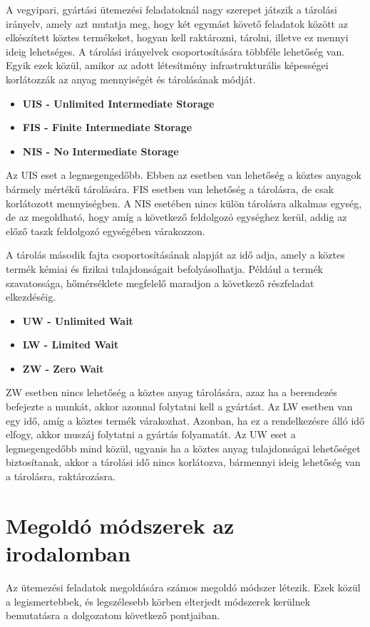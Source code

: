 \newpage
A vegyipari, gyártási ütemezési feladatoknál nagy szerepet játszik a tárolási irányelv, amely azt mutatja meg, hogy két egymást követő feladatok között az elkészített köztes termékeket, hogyan kell raktározni, tárolni, illetve ez mennyi ideig lehetséges. A tárolási irányelvek csoportosítására többféle lehetőség van. Egyik ezek közül, amikor az adott létesítmény infrastrukturális képességei korlátozzák az anyag mennyiségét és tárolásának módját.
\begin{itemize}
	\item \textbf{UIS - Unlimited Intermediate Storage}
	\item \textbf{FIS - Finite Intermediate Storage}
	\item \textbf{NIS - No Intermediate Storage}
\end{itemize}
Az UIS eset a legmegengedőbb. Ebben az esetben van lehetőség a köztes anyagok bármely mértékű tárolására. FIS esetben van lehetőség a tárolásra, de csak korlátozott mennyiségben. A NIS esetében nincs külön tárolásra alkalmas egység, de az megoldható, hogy amíg a következő feldolgozó egységhez kerül, addig az előző taszk feldolgozó egységében várakozzon.	

A tárolás második fajta csoportosításának alapját az idő adja, amely a köztes termék kémiai és fizikai tulajdonságait befolyásolhatja. Például a termék szavatossága, hőmérséklete megfelelő maradjon a következő részfeladat elkezdéséig.	
\begin{itemize}
	\item \textbf{UW - Unlimited Wait}
	\item \textbf{LW - Limited Wait}
	\item \textbf{ZW - Zero Wait}	
\end{itemize}
ZW esetben nincs lehetőség a köztes anyag tárolására, azaz ha a berendezés befejezte a munkát, akkor azonnal folytatni kell a gyártást. Az LW esetben van egy idő, amíg a köztes termék várakozhat. Azonban, ha ez a rendelkezésre álló idő elfogy, akkor muszáj folytatni a gyártás folyamatát. Az UW eset a legmegengedőbb mind közül, ugyanis ha a köztes anyag tulajdonságai lehetőséget biztosítanak, akkor a tárolási idő nincs korlátozva, bármennyi ideig lehetőség van a tárolásra, raktározásra.
\newpage
\section{Megoldó módszerek az irodalomban}
Az ütemezési feladatok megoldására számos megoldó módszer létezik. Ezek közül a legismertebbek, és legszélesebb körben elterjedt módszerek kerülnek bemutatásra a dolgozatom következő pontjaiban.
